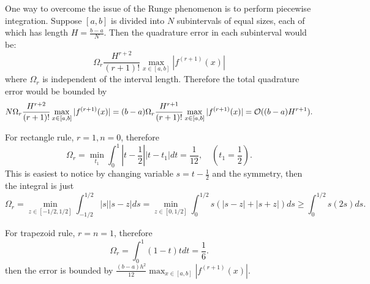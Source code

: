 One way to overcome the issue of the Runge phenomenon is to perform piecewise integration. Suppose $[a, b]$ is divided into $N$ subintervals of equal sizes, each of which has length $H = \frac{b-a}{N}$. Then the quadrature error in each subinterval would be:
$$\Omega_r \frac{H^{r+2}}{(r+1)!}   \max_{x\in[a,b]}|f^{(r+1)}(x)|$$
where $\Omega_r$ is independent of the interval length. Therefore the total quadrature error would be bounded by 
$$N\Omega_r \frac{H^{r+2}}{(r+1)!}   \max_{x\in[a,b]}|f^{(r+1)}(x)| =  (b-a)\Omega_r \frac{H^{r+1}}{(r+1)!}   \max_{x\in[a,b]}|f^{(r+1)}(x)| =\mathcal O((b-a)H^{r+1}).$$
\begin{example} 
    For rectangle rule, $r = 1, n= 0$, therefore 
    \begin{equation}
        \Omega_r = \min_{t_1} \int_0^1 |t - \frac{1}{2}||t - t_1| dt  = \frac{1}{12}, \quad (t_1 = \frac{1}{2}).
    \end{equation}
This is easiest to notice by changing variable $s = t - \frac{1}{2}$ and the symmetry, then the integral is just 
$$\Omega_r = \min_{z\in [-1/2, 1/2]} \int_{-1/2}^{1/2} |s||s - z| ds =  \min_{z\in [0, 1/2]} \int_{0}^{1/2} s (|s - z| + |s + z|) ds \ge   \int_{0}^{1/2} s (2s) ds. $$ 
\end{example}
\begin{example}
    For trapezoid rule, $r = n = 1$, therefore 
    \begin{equation}
        \Omega_r = \int_0^1 (1-t)t dt = \frac{1}{6}.
    \end{equation}
    then the error is bounded by $\frac{(b-a)h^2}{12}  \max_{x\in[a,b]}|f^{(r+1)}(x)|$. 
\end{example}

